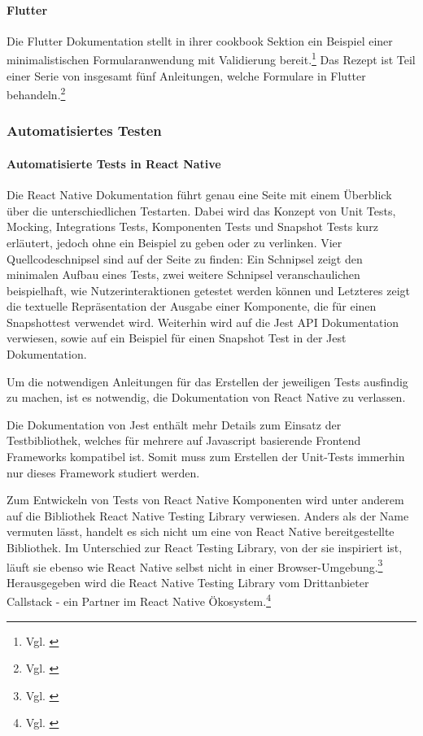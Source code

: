 \paragraph{Flutter}
Die Flutter Dokumentation stellt in ihrer cookbook Sektion ein Beispiel einer minimalistischen Formularanwendung mit Validierung bereit.\footnote{Vgl. \cite{BuildAFormWithValidation}} Das Rezept ist Teil einer Serie von insgesamt fünf Anleitungen, welche Formulare in Flutter behandeln.\footnote{Vgl. \cite{FormsFlutter}}

\subsubsection{Automatisiertes Testen}

\paragraph{Automatisierte Tests in React Native} Die React Native Dokumentation führt genau eine Seite mit einem Überblick über die unterschiedlichen Testarten. Dabei wird das Konzept von Unit Tests, Mocking, Integrations Tests, Komponenten Tests und Snapshot Tests kurz erläutert, jedoch ohne ein Beispiel zu geben oder zu verlinken. Vier Quellcodeschnipsel sind auf der Seite zu finden: Ein Schnipsel zeigt den minimalen Aufbau eines Tests, zwei weitere Schnipsel veranschaulichen beispielhaft, wie Nutzerinteraktionen getestet werden können und Letzteres zeigt die textuelle Repräsentation der Ausgabe einer Komponente, die für einen Snapshottest verwendet wird. Weiterhin wird auf die Jest API Dokumentation verwiesen, sowie auf ein Beispiel für einen Snapshot Test in der Jest Dokumentation.

Um die notwendigen Anleitungen für das Erstellen der jeweiligen Tests ausfindig zu machen, ist es notwendig, die Dokumentation von React Native zu verlassen.

Die Dokumentation von Jest enthält mehr Details zum Einsatz der Testbibliothek, welches für mehrere auf Javascript basierende Frontend Frameworks kompatibel ist. Somit muss zum Erstellen der Unit-Tests immerhin nur dieses Framework studiert werden.

Zum Entwickeln von Tests von React Native Komponenten wird unter anderem auf die Bibliothek React Native Testing Library verwiesen. Anders als der Name vermuten lässt, handelt es sich nicht um eine von React Native bereitgestellte Bibliothek. Im Unterschied zur React Testing Library, von der sie inspiriert ist, läuft sie  ebenso  wie React Native selbst nicht in einer Browser-Umgebung.\footnote{Vgl. \cite{NativeTestingLibraryIntroduction}} Herausgegeben wird die React Native Testing Library vom Drittanbieter Callstack - ein Partner im React Native Ökosystem.\footnote{Vgl. \cite{TheReactNativeEcosystem}}

